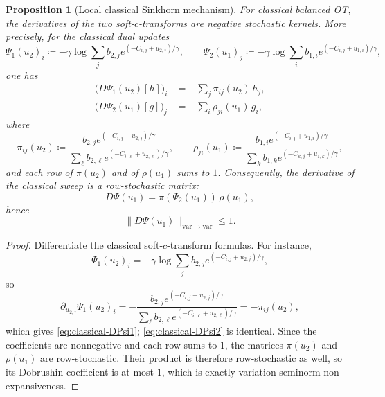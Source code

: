 \documentclass[11pt]{article}
\newcommand{\eqdef}{\coloneqq}
\theoremstyle{plain}
\newtheorem{proposition}{Proposition}[section]
\begin{document}
\begin{proposition}[Local classical Sinkhorn mechanism]
\label{prop:qot-classical-local-kernel}
For classical balanced OT, the derivatives of the two soft-$c$-transforms are negative stochastic kernels.
More precisely, for the classical dual updates
\[
\Psi_1(u_2)_i
\eqdef
-\gamma \log \sum_j b_{2,j} e^{(-C_{i,j}+u_{2,j})/\gamma},
\qquad
\Psi_2(u_1)_j
\eqdef
-\gamma \log \sum_i b_{1,i} e^{(-C_{i,j}+u_{1,i})/\gamma},
\]
one has
\begin{align}
\bigl(D\Psi_1(u_2)[h]\bigr)_i
&=
-\sum_j \pi_{ij}(u_2)\,h_j,
\label{eq:classical-DPsi1}\\
\bigl(D\Psi_2(u_1)[g]\bigr)_j
&=
-\sum_i \rho_{ji}(u_1)\,g_i,
\label{eq:classical-DPsi2}
\end{align}
where
\[
\pi_{ij}(u_2)
\eqdef
\frac{b_{2,j}e^{(-C_{i,j}+u_{2,j})/\gamma}}
{\sum_\ell b_{2,\ell}e^{(-C_{i,\ell}+u_{2,\ell})/\gamma}},
\qquad
\rho_{ji}(u_1)
\eqdef
\frac{b_{1,i}e^{(-C_{i,j}+u_{1,i})/\gamma}}
{\sum_k b_{1,k}e^{(-C_{k,j}+u_{1,k})/\gamma}},
\]
and each row of $\pi(u_2)$ and of $\rho(u_1)$ sums to $1$.
Consequently, the derivative of the classical sweep is a row-stochastic matrix:
\[
D\Psi(u_1)=\pi(\Psi_2(u_1))\,\rho(u_1),
\]
hence
\[
\|D\Psi(u_1)\|_{\mathrm{var}\to\mathrm{var}}\le 1.
\]
\end{proposition}

\begin{proof}
Differentiate the classical soft-$c$-transform formulas. For instance,
\[
\Psi_1(u_2)_i
=
-\gamma \log \sum_j b_{2,j} e^{(-C_{i,j}+u_{2,j})/\gamma},
\]
so
\[
\partial_{u_{2,j}}\Psi_1(u_2)_i
=
-\frac{b_{2,j}e^{(-C_{i,j}+u_{2,j})/\gamma}}
{\sum_\ell b_{2,\ell}e^{(-C_{i,\ell}+u_{2,\ell})/\gamma}}
=-\pi_{ij}(u_2),
\]
which gives \eqref{eq:classical-DPsi1}; \eqref{eq:classical-DPsi2} is identical.
Since the coefficients are nonnegative and each row sums to $1$, the matrices $\pi(u_2)$ and $\rho(u_1)$ are row-stochastic.
Their product is therefore row-stochastic as well, so its Dobrushin coefficient is at most $1$, which is exactly variation-seminorm non-expansiveness.
\end{proof}
\end{document}
